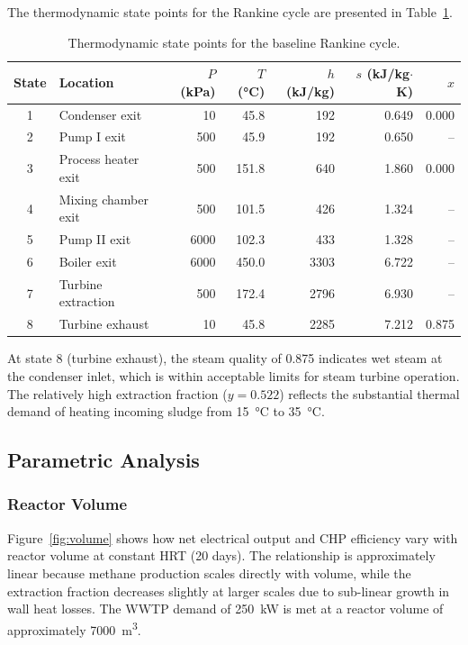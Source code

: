 \documentclass[12pt, letterpaper]{article}
\begin{document}
The thermodynamic state points for the Rankine cycle are presented in Table~\ref{tab:states}.

\begin{table}[H]
  \centering
  \caption{Thermodynamic state points for the baseline Rankine cycle.}
  \label{tab:states}
  \begin{tabular}{@{}clrrrrr@{}}
    \toprule
    \textbf{State} & \textbf{Location} & \textbf{$P$ (kPa)} & \textbf{$T$ (\si{\celsius})} & \textbf{$h$ (kJ/kg)} & \textbf{$s$ (kJ/kg$\cdot$K)} & \textbf{$x$} \\
    \midrule
    1 & Condenser exit       &    10 &  45.8 &  192 & 0.649 & 0.000 \\
    2 & Pump I exit          &   500 &  45.9 &  192 & 0.650 & -- \\
    3 & Process heater exit  &   500 & 151.8 &  640 & 1.860 & 0.000 \\
    4 & Mixing chamber exit  &   500 & 101.5 &  426 & 1.324 & -- \\
    5 & Pump II exit         &  6000 & 102.3 &  433 & 1.328 & -- \\
    6 & Boiler exit          &  6000 & 450.0 & 3303 & 6.722 & -- \\
    7 & Turbine extraction   &   500 & 172.4 & 2796 & 6.930 & -- \\
    8 & Turbine exhaust      &    10 &  45.8 & 2285 & 7.212 & 0.875 \\
    \bottomrule
  \end{tabular}
\end{table}

At state 8 (turbine exhaust), the steam quality of 0.875 indicates wet steam at the condenser inlet, which is within acceptable limits for steam turbine operation. The relatively high extraction fraction ($y = 0.522$) reflects the substantial thermal demand of heating incoming sludge from \SI{15}{\celsius} to \SI{35}{\celsius}.

\subsection{Parametric Analysis}

\subsubsection{Reactor Volume}

Figure~\ref{fig:volume} shows how net electrical output and CHP efficiency vary with reactor volume at constant HRT (20 days). The relationship is approximately linear because methane production scales directly with volume, while the extraction fraction decreases slightly at larger scales due to sub-linear growth in wall heat losses. The WWTP demand of \SI{250}{\kilo\watt} is met at a reactor volume of approximately \SI{7000}{\cubic\metre}.
\end{document}

